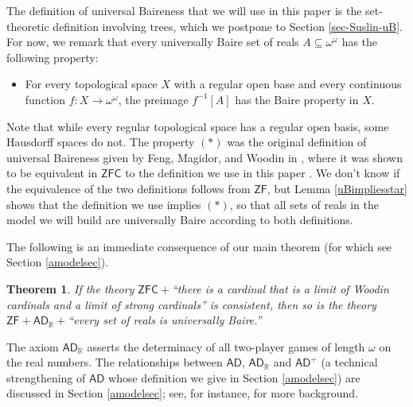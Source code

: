 \documentclass[fleqn, 11pt]{amsart}
\theoremstyle{plain}
\newtheorem{thm}{Theorem}[section]
\theoremstyle{definition}
\theoremstyle{remark}
\newcommand{\bbR}{\mathbb{R}}
\newcommand{\ZF}{\mathsf{ZF}}
\newcommand{\AD}{\mathsf{AD}}
\newcommand{\ADR}{\mathsf{AD}_{\bbR}}
\begin{document}
The definition of universal Baireness that we will use in this paper is the set-theoretic definition involving trees, which we postpone to Section \ref{sec-Suslin-uB}.
For now, we remark that every universally Baire
set of reals $A \subseteq \omega^\omega$ has the following property:
\begin{itemize}
 \item[$(\ast)$]
 For every topological space $X$ with a regular open base and every continuous function
 $f \colon X \to \omega^\omega$, the preimage $f^{-1}[A]$ has the Baire property in $X$.
\end{itemize}
Note that while every regular topological space has a regular open basis, some Hausdorff spaces do not. The property $(\ast)$ was the original definition of universal Baireness given by Feng, Magidor, and Woodin in  \cite{FenMagWoo}, where it was shown  to be equivalent in $\mathsf{ZFC}$ to the definition we use in this paper \cite[Corollary 2.1(3)]{FenMagWoo}.
We don't know if the equivalence of the two definitions follows from $\ZF$, but Lemma \ref{uBimpliesstar} shows
that the definition we use implies $(\ast)$, so that all sets of reals in the model we will build are universally Baire according to both definitions.


The following is an immediate consequence of our main theorem (for which see Section \ref{amodelsec}). 

\begin{thm}\label{thm-relative-consistency}
 If the theory $\mathsf{ZFC} + {}$``there is a cardinal that is a limit of Woodin cardinals and a limit of strong cardinals'' is consistent, then so is the theory $\mathsf{ZF} + \ADR + {}$``every set of reals is universally Baire.''
\end{thm}

The axiom $\ADR$ asserts the determinacy of all two-player games of length $\omega$ on the real numbers. The relationships between $\AD$, $\ADR$ and $\AD^{+}$ (a technical strengthening of $\AD$ whose definition we give in Section \ref{amodelsec}) are discussed in Section \ref{amodelsec}; see, for instance, \cite{Larson:Extensions} for more background. 

\end{document}
